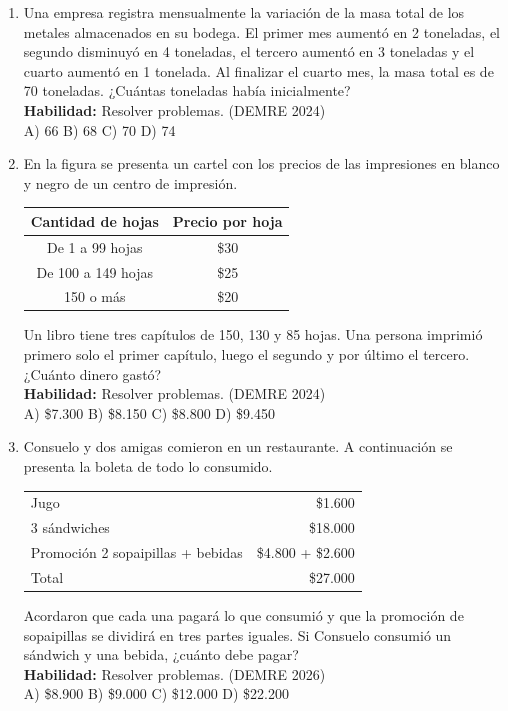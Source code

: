 \documentclass[11pt,letterpaper]{article}
\begin{document}
\begin{enumerate}[label=\textbf{\arabic*.}, leftmargin=*, itemsep=8pt, start=6]
\item Una empresa registra mensualmente la variación de la masa total de los metales almacenados en su bodega. El primer mes aumentó en 2 toneladas, el segundo disminuyó en 4 toneladas, el tercero aumentó en 3 toneladas y el cuarto aumentó en 1 tonelada. Al finalizar el cuarto mes, la masa total es de 70 toneladas. ¿Cuántas toneladas había inicialmente?\\
\textbf{Habilidad:} Resolver problemas. (DEMRE 2024)\\
A) 66 \quad B) 68 \quad C) 70 \quad D) 74

\item En la figura se presenta un cartel con los precios de las impresiones en blanco y negro de un centro de impresión.\\
\begin{center}
\begin{tabular}{cc}
\toprule
Cantidad de hojas & Precio por hoja \\
\midrule
De 1 a 99 hojas & \$30 \\
De 100 a 149 hojas & \$25 \\
150 o más & \$20 \\
\bottomrule
\end{tabular}
\end{center}
Un libro tiene tres capítulos de 150, 130 y 85 hojas. Una persona imprimió primero solo el primer capítulo, luego el segundo y por último el tercero. ¿Cuánto dinero gastó?\\
\textbf{Habilidad:} Resolver problemas. (DEMRE 2024)\\
A) \$7.300 \quad B) \$8.150 \quad C) \$8.800 \quad D) \$9.450

\item Consuelo y dos amigas comieron en un restaurante. A continuación se presenta la boleta de todo lo consumido.\\
\begin{center}
\begin{tabular}{|l|r|}
\hline
Jugo & \$1.600 \\
3 sándwiches & \$18.000 \\
Promoción 2 sopaipillas + bebidas & \$4.800 + \$2.600 \\
\hline
Total & \$27.000 \\
\hline
\end{tabular}
\end{center}
Acordaron que cada una pagará lo que consumió y que la promoción de sopaipillas se dividirá en tres partes iguales. Si Consuelo consumió un sándwich y una bebida, ¿cuánto debe pagar?\\
\textbf{Habilidad:} Resolver problemas. (DEMRE 2026)\\
A) \$8.900 \quad B) \$9.000 \quad C) \$12.000 \quad D) \$22.200


\end{enumerate}
\end{document}
